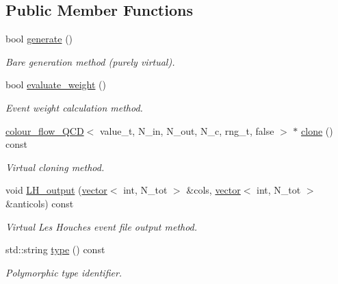 \subsection*{Public Member Functions}
\begin{DoxyCompactItemize}
\item 
bool \hyperlink{a00075_ac8eda5c5f4bbba96b3d68444726dac5b}{generate} ()
\begin{DoxyCompactList}\small\item\em \textquotesingle{}Bare generation\textquotesingle{} method (purely virtual). \end{DoxyCompactList}\item 
\hypertarget{a00075_a5f9c49812bf581bc3b699aeb9a8727b5}{}bool \hyperlink{a00075_a5f9c49812bf581bc3b699aeb9a8727b5}{evaluate\+\_\+weight} ()\label{a00075_a5f9c49812bf581bc3b699aeb9a8727b5}

\begin{DoxyCompactList}\small\item\em Event weight calculation method. \end{DoxyCompactList}\item 
\hypertarget{a00075_a63f9d00551a5c7516457f4c39c15eb22}{}\hyperlink{a00074}{colour\+\_\+flow\+\_\+\+Q\+C\+D}$<$ value\+\_\+t, N\+\_\+in, N\+\_\+out, N\+\_\+c, rng\+\_\+t, false $>$ $\ast$ \hyperlink{a00075_a63f9d00551a5c7516457f4c39c15eb22}{clone} () const \label{a00075_a63f9d00551a5c7516457f4c39c15eb22}

\begin{DoxyCompactList}\small\item\em Virtual cloning method. \end{DoxyCompactList}\item 
\hypertarget{a00075_a98ffd230962239afa3f83cea329b97f4}{}void \hyperlink{a00075_a98ffd230962239afa3f83cea329b97f4}{L\+H\+\_\+output} (\hyperlink{a00579}{vector}$<$ int, N\+\_\+tot $>$ \&cols, \hyperlink{a00579}{vector}$<$ int, N\+\_\+tot $>$ \&anticols) const \label{a00075_a98ffd230962239afa3f83cea329b97f4}

\begin{DoxyCompactList}\small\item\em Virtual Les Houches event file output method. \end{DoxyCompactList}\item 
\hypertarget{a00075_a16724dc988fa1127b7a8e19cd017e828}{}std\+::string \hyperlink{a00075_a16724dc988fa1127b7a8e19cd017e828}{type} () const \label{a00075_a16724dc988fa1127b7a8e19cd017e828}

\begin{DoxyCompactList}\small\item\em Polymorphic type identifier. \end{DoxyCompactList}\end{DoxyCompactItemize}
